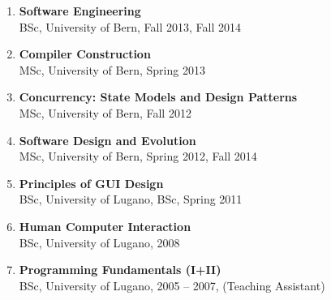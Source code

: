 
\newcommand {\lecture}[3]{\item {\bf #1}\\#2, #3 }
\newcommand {\ub}{University of Bern}
\newcommand {\ul}{University of Lugano}
\newcommand {\msc}{MSc, }
\newcommand {\bsc}{BSc, }

\begin{enumerate}
	\lecture{Software Engineering}{\bsc \ub}{Fall 2013, Fall 2014}
	\lecture {Compiler Construction}{\msc \ub}{Spring 2013}
	\lecture {Concurrency: State Models and Design Patterns}{\msc \ub}{Fall 2012}
	\lecture {Software Design and Evolution}{\msc \ub}{Spring 2012, Fall 2014}
	\lecture {Principles of GUI Design}{\bsc \ul}{\bsc Spring 2011}
	\lecture {Human Computer Interaction}{\bsc \ul}{2008}
	\lecture {Programming Fundamentals (I+II)}{\bsc \ul}{2005 -- 2007, (Teaching Assistant)}

\end{enumerate}